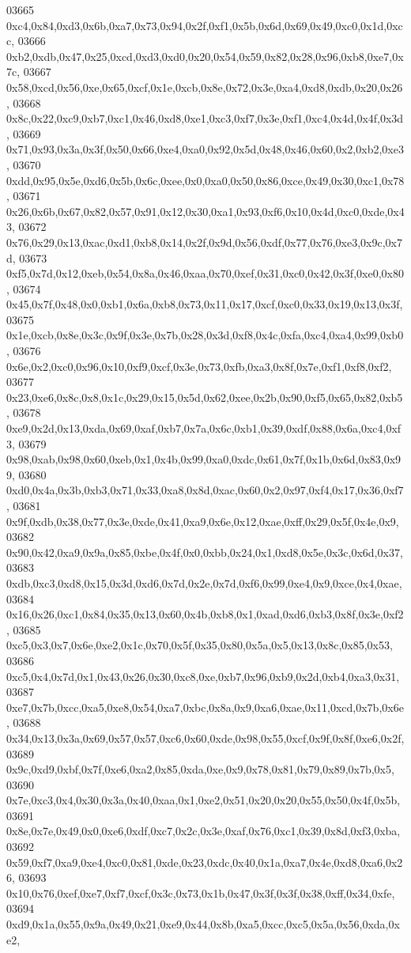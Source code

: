 \begin{DoxyCode}
03665   0xc4,0x84,0xd3,0x6b,0xa7,0x73,0x94,0x2f,0xf1,0x5b,0x6d,0x69,0x49,0xc0,0x1d,0xcc,
03666   0xb2,0xdb,0x47,0x25,0xcd,0xd3,0xd0,0x20,0x54,0x59,0x82,0x28,0x96,0xb8,0xe7,0x7c,
03667   0x58,0xcd,0x56,0xe,0x65,0xcf,0x1e,0xcb,0x8e,0x72,0x3e,0xa4,0xd8,0xdb,0x20,0x26,
03668   0x8c,0x22,0xc9,0xb7,0xc1,0x46,0xd8,0xe1,0xc3,0xf7,0x3e,0xf1,0xc4,0x4d,0x4f,0x3d,
03669   0x71,0x93,0x3a,0x3f,0x50,0x66,0xe4,0xa0,0x92,0x5d,0x48,0x46,0x60,0x2,0xb2,0xe3,
03670   0xdd,0x95,0x5e,0xd6,0x5b,0x6c,0xee,0x0,0xa0,0x50,0x86,0xce,0x49,0x30,0xc1,0x78,
03671   0x26,0x6b,0x67,0x82,0x57,0x91,0x12,0x30,0xa1,0x93,0xf6,0x10,0x4d,0xc0,0xde,0x43,
03672   0x76,0x29,0x13,0xac,0xd1,0xb8,0x14,0x2f,0x9d,0x56,0xdf,0x77,0x76,0xe3,0x9c,0x7d,
03673   0xf5,0x7d,0x12,0xeb,0x54,0x8a,0x46,0xaa,0x70,0xef,0x31,0xc0,0x42,0x3f,0xe0,0x80,
03674   0x45,0x7f,0x48,0x0,0xb1,0x6a,0xb8,0x73,0x11,0x17,0xcf,0xc0,0x33,0x19,0x13,0x3f,
03675   0x1e,0xcb,0x8e,0x3c,0x9f,0x3e,0x7b,0x28,0x3d,0xf8,0x4c,0xfa,0xc4,0xa4,0x99,0xb0,
03676   0x6e,0x2,0xc0,0x96,0x10,0xf9,0xcf,0x3e,0x73,0xfb,0xa3,0x8f,0x7e,0xf1,0xf8,0xf2,
03677   0x23,0xe6,0x8c,0x8,0x1c,0x29,0x15,0x5d,0x62,0xee,0x2b,0x90,0xf5,0x65,0x82,0xb5,
03678   0xe9,0x2d,0x13,0xda,0x69,0xaf,0xb7,0x7a,0x6c,0xb1,0x39,0xdf,0x88,0x6a,0xc4,0xf3,
03679   0x98,0xab,0x98,0x60,0xeb,0x1,0x4b,0x99,0xa0,0xdc,0x61,0x7f,0x1b,0x6d,0x83,0x99,
03680   0xd0,0x4a,0x3b,0xb3,0x71,0x33,0xa8,0x8d,0xac,0x60,0x2,0x97,0xf4,0x17,0x36,0xf7,
03681   0x9f,0xdb,0x38,0x77,0x3e,0xde,0x41,0xa9,0x6e,0x12,0xae,0xff,0x29,0x5f,0x4e,0x9,
03682   0x90,0x42,0xa9,0x9a,0x85,0xbe,0x4f,0x0,0xbb,0x24,0x1,0xd8,0x5e,0x3c,0x6d,0x37,
03683   0xdb,0xc3,0xd8,0x15,0x3d,0xd6,0x7d,0x2e,0x7d,0xf6,0x99,0xe4,0x9,0xce,0x4,0xae,
03684   0x16,0x26,0xc1,0x84,0x35,0x13,0x60,0x4b,0xb8,0x1,0xad,0xd6,0xb3,0x8f,0x3e,0xf2,
03685   0xc5,0x3,0x7,0x6e,0xe2,0x1c,0x70,0x5f,0x35,0x80,0x5a,0x5,0x13,0x8c,0x85,0x53,
03686   0xc5,0x4,0x7d,0x1,0x43,0x26,0x30,0xc8,0xe,0xb7,0x96,0xb9,0x2d,0xb4,0xa3,0x31,
03687   0xe7,0x7b,0xcc,0xa5,0xe8,0x54,0xa7,0xbc,0x8a,0x9,0xa6,0xae,0x11,0xcd,0x7b,0x6e,
03688   0x34,0x13,0x3a,0x69,0x57,0x57,0xc6,0x60,0xde,0x98,0x55,0xcf,0x9f,0x8f,0xe6,0x2f,
03689   0x9c,0xd9,0xbf,0x7f,0xe6,0xa2,0x85,0xda,0xe,0x9,0x78,0x81,0x79,0x89,0x7b,0x5,
03690   0x7e,0xc3,0x4,0x30,0x3a,0x40,0xaa,0x1,0xe2,0x51,0x20,0x20,0x55,0x50,0x4f,0x5b,
03691   0x8e,0x7e,0x49,0x0,0xe6,0xdf,0xc7,0x2c,0x3e,0xaf,0x76,0xc1,0x39,0x8d,0xf3,0xba,
03692   0x59,0xf7,0xa9,0xe4,0xc0,0x81,0xde,0x23,0xdc,0x40,0x1a,0xa7,0x4e,0xd8,0xa6,0x26,
03693   0x10,0x76,0xef,0xe7,0xf7,0xcf,0x3c,0x73,0x1b,0x47,0x3f,0x3f,0x38,0xff,0x34,0xfe,
03694   0xd9,0x1a,0x55,0x9a,0x49,0x21,0xe9,0x44,0x8b,0xa5,0xcc,0xc5,0x5a,0x56,0xda,0xe2,

\end{DoxyCode}
